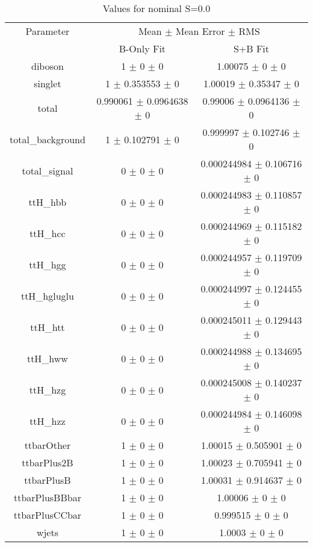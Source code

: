 \begin{table}
\centering
\caption{Values for nominal S=0.0}
\begin{tabular}{ccc}
\toprule
Parameter & \multicolumn{2}{c}{Mean $\pm$ Mean Error $\pm$ RMS}\\
 & B-Only Fit & S+B Fit\\
\midrule
diboson & \num{1} $\pm$ \num{0} $\pm$ \num{0} & \num{1.00075} $\pm$ \num{0} $\pm$ \num{0}\\
singlet & \num{1} $\pm$ \num{0.353553} $\pm$ \num{0} & \num{1.00019} $\pm$ \num{0.35347} $\pm$ \num{0}\\
total & \num{0.990061} $\pm$ \num{0.0964638} $\pm$ \num{0} & \num{0.99006} $\pm$ \num{0.0964136} $\pm$ \num{0}\\
total\_background & \num{1} $\pm$ \num{0.102791} $\pm$ \num{0} & \num{0.999997} $\pm$ \num{0.102746} $\pm$ \num{0}\\
total\_signal & \num{0} $\pm$ \num{0} $\pm$ \num{0} & \num{0.000244984} $\pm$ \num{0.106716} $\pm$ \num{0}\\
ttH\_hbb & \num{0} $\pm$ \num{0} $\pm$ \num{0} & \num{0.000244983} $\pm$ \num{0.110857} $\pm$ \num{0}\\
ttH\_hcc & \num{0} $\pm$ \num{0} $\pm$ \num{0} & \num{0.000244969} $\pm$ \num{0.115182} $\pm$ \num{0}\\
ttH\_hgg & \num{0} $\pm$ \num{0} $\pm$ \num{0} & \num{0.000244957} $\pm$ \num{0.119709} $\pm$ \num{0}\\
ttH\_hgluglu & \num{0} $\pm$ \num{0} $\pm$ \num{0} & \num{0.000244997} $\pm$ \num{0.124455} $\pm$ \num{0}\\
ttH\_htt & \num{0} $\pm$ \num{0} $\pm$ \num{0} & \num{0.000245011} $\pm$ \num{0.129443} $\pm$ \num{0}\\
ttH\_hww & \num{0} $\pm$ \num{0} $\pm$ \num{0} & \num{0.000244988} $\pm$ \num{0.134695} $\pm$ \num{0}\\
ttH\_hzg & \num{0} $\pm$ \num{0} $\pm$ \num{0} & \num{0.000245008} $\pm$ \num{0.140237} $\pm$ \num{0}\\
ttH\_hzz & \num{0} $\pm$ \num{0} $\pm$ \num{0} & \num{0.000244984} $\pm$ \num{0.146098} $\pm$ \num{0}\\
ttbarOther & \num{1} $\pm$ \num{0} $\pm$ \num{0} & \num{1.00015} $\pm$ \num{0.505901} $\pm$ \num{0}\\
ttbarPlus2B & \num{1} $\pm$ \num{0} $\pm$ \num{0} & \num{1.00023} $\pm$ \num{0.705941} $\pm$ \num{0}\\
ttbarPlusB & \num{1} $\pm$ \num{0} $\pm$ \num{0} & \num{1.00031} $\pm$ \num{0.914637} $\pm$ \num{0}\\
ttbarPlusBBbar & \num{1} $\pm$ \num{0} $\pm$ \num{0} & \num{1.00006} $\pm$ \num{0} $\pm$ \num{0}\\
ttbarPlusCCbar & \num{1} $\pm$ \num{0} $\pm$ \num{0} & \num{0.999515} $\pm$ \num{0} $\pm$ \num{0}\\
wjets & \num{1} $\pm$ \num{0} $\pm$ \num{0} & \num{1.0003} $\pm$ \num{0} $\pm$ \num{0}\\
\bottomrule
\end{tabular}
\end{table}